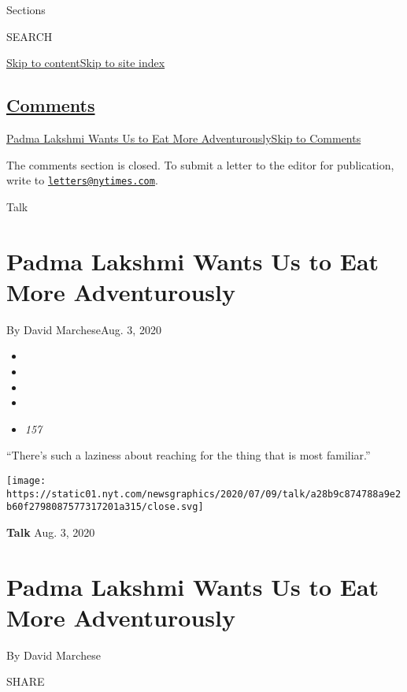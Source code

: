 Sections

SEARCH

\protect\hyperlink{site-content}{Skip to
content}\protect\hyperlink{site-index}{Skip to site index}

\hypertarget{comments}{%
\subsection{\texorpdfstring{\protect\hyperlink{commentsContainer}{Comments}}{Comments}}\label{comments}}

\href{}{Padma Lakshmi Wants Us to Eat More Adventurously}\href{}{Skip to
Comments}

The comments section is closed. To submit a letter to the editor for
publication, write to
\href{mailto:letters@nytimes.com}{\nolinkurl{letters@nytimes.com}}.

Talk

\hypertarget{padma-lakshmi-wants-us-to-eat-more-adventurously}{%
\section{Padma Lakshmi Wants Us to Eat More
Adventurously}\label{padma-lakshmi-wants-us-to-eat-more-adventurously}}

By David MarcheseAug. 3, 2020

\begin{itemize}
\item
\item
\item
\item
\item
  \emph{157}
\end{itemize}

``There's such a laziness about reaching for the thing that is most
familiar.''

\texttt{[image: https://static01.nyt.com/newsgraphics/2020/07/09/talk/a28b9c874788a9e2b60f2798087577317201a315/close.svg]}

\textbf{Talk} Aug. 3, 2020

\hypertarget{padma-lakshmi-wants-us-to-eat-more-adventurously-1}{%
\section{Padma Lakshmi Wants Us to Eat More
Adventurously}\label{padma-lakshmi-wants-us-to-eat-more-adventurously-1}}

By David Marchese

SHARE

